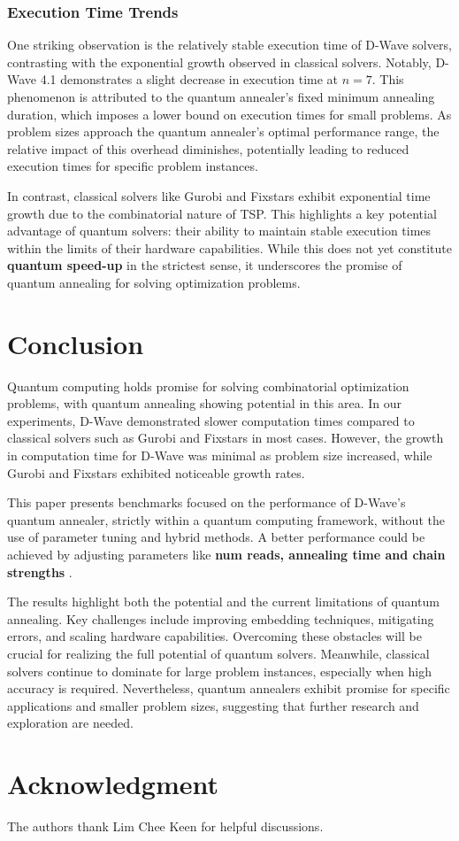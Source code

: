\documentclass[conference]{IEEEtran}
\begin{document}
\subsubsection{Execution Time Trends}
One striking observation is the relatively stable execution time of D-Wave solvers, contrasting with the exponential growth observed in classical solvers. Notably, D-Wave 4.1 demonstrates a slight decrease in execution time at \(n=7\). 
This phenomenon is attributed to the quantum annealer's fixed minimum annealing duration, which imposes a lower bound on execution times for small problems. 
As problem sizes approach the quantum annealer's optimal performance range, the relative impact of this overhead diminishes, potentially leading to reduced execution times for specific problem instances. 

In contrast, classical solvers like Gurobi and Fixstars exhibit exponential time growth due to the combinatorial nature of TSP. 
This highlights a key potential advantage of quantum solvers: their ability to maintain stable execution times within the limits of their hardware capabilities. 
While this does not yet constitute \textbf{quantum speed-up} in the strictest sense, it underscores the promise of quantum annealing for solving optimization problems.


\section{Conclusion}
Quantum computing holds promise for solving combinatorial optimization problems, with quantum annealing showing potential in this area. 
In our experiments, D-Wave demonstrated slower computation times compared to classical solvers such as Gurobi and Fixstars in most cases. 
However, the growth in computation time for D-Wave was minimal as problem size increased, while Gurobi and Fixstars exhibited noticeable growth rates. 

This paper presents benchmarks focused on the performance of D-Wave's quantum annealer, strictly within a quantum computing framework, without the use of parameter tuning and hybrid methods. 
A better performance could be achieved by adjusting parameters like \textbf{num reads, annealing time and chain strengths} \cite{villarrodriguez2022analyzingbehaviourdwavequantum}. 

The results highlight both the potential and the current limitations of quantum annealing. Key challenges include improving embedding techniques, mitigating errors, and scaling hardware capabilities. 
Overcoming these obstacles will be crucial for realizing the full potential of quantum solvers. 
Meanwhile, classical solvers continue to dominate for large problem instances, especially when high accuracy is required. Nevertheless, quantum annealers exhibit promise for specific applications and smaller problem sizes, suggesting that further research and exploration are needed.

\section*{Acknowledgment}

The authors thank Lim Chee Keen for helpful discussions. 




\vspace{12pt}
\end{document}
